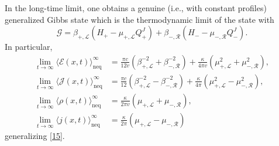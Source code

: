 \documentclass[12pt,a4paper]{article}
\newcommand{\cE}{\mathcal{E}}
\newcommand{\cG}{\mathcal{G}}
\newcommand{\cJ}{\mathcal{J}}
\newcommand{\cL}{\mathcal{L}}
\newcommand{\cR}{\mathcal{R}}
\theoremstyle{definition}
\theoremstyle{remark}
\begin{document}
In the long-time limit, one obtains a genuine 
(i.e., with constant profiles) generalized Gibbs state 
which is the thermodynamic limit of the state with
%
\begin{equation}
\cG=\beta_{+,\cL}(H_+-\mu_{+,\cL}Q^J_+)+\beta_{-,\cR}(H_--\mu_{-,\cR}Q^J_-).
\end{equation}
%
In particular,
%
\begin{align}
\lim_{t\to\infty} \langle \cE(x,t) \rangle^\infty_{\text{neq}}
& = \frac{\pi c}{12v} \left( \beta_{+,\cL}^{-2}+\beta_{-,\cR}^{-2} \right)
		+ \frac{\kappa}{4\pi v}\left(\mu_{+,\cL}^2+\mu_{-,\cR}^2\right), \\
\lim_{t\to\infty} \langle \cJ(x,t) \rangle^\infty_{\text{neq}}
& = \frac{\pi c}{12} \left( \beta_{+,\cL}^{-2} - \beta_{-,\cR}^{-2} \right)
		+ \frac{\kappa}{4\pi}\left(\mu_{+,\cL}^2-\mu_{-,\cR}^2\right), \\
\lim_{t\to\infty} \langle \rho(x,t) \rangle^\infty_{\text{neq}}
& = \frac{\kappa}{2\pi v}\left(\mu_{+,\cL}+\mu_{-,\cR}\right),
		\label{permrho} \\
\lim_{t\to\infty} \langle j(x,t) \rangle^\infty_{\text{neq}}
& = \frac{\kappa}{2\pi}\left(\mu_{+,\cL}-\mu_{-,\cR}\right)
		\label{permj}
\end{align}
%
generalizing \eqref{15}. 
\end{document}
